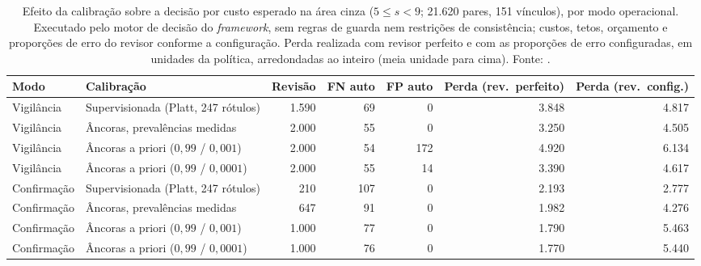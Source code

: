 \begin{table}[!ht]
\centering
\caption{Efeito da calibração sobre a decisão por custo esperado na área cinza ($5\leq s<9$; 21.620 pares, 151 vínculos), por modo operacional. Executado pelo motor de decisão do \textit{framework}, sem regras de guarda nem restrições de consistência; custos, tetos, orçamento e proporções de erro do revisor conforme a configuração. Perda realizada com revisor perfeito e com as proporções de erro configuradas, em unidades da política, arredondadas ao inteiro (meia unidade para cima). Fonte: .}
\label{tab:cap8-ancoras-decisao}
\scriptsize
\setlength{\tabcolsep}{3pt}
\begin{tabular}{|l|l|r|r|r|r|r|}
\hline
Modo & Calibração & Revisão & FN auto & FP auto & Perda (rev.\ perfeito) & Perda (rev.\ config.) \\
\hline
Vigilância & Supervisionada (Platt, 247 rótulos) & 1.590 & 69 & 0 & 3.848 & 4.817 \\
Vigilância & Âncoras, prevalências medidas & 2.000 & 55 & 0 & 3.250 & 4.505 \\
Vigilância & Âncoras a priori ($0{,}99$ / $0{,}001$) & 2.000 & 54 & 172 & 4.920 & 6.134 \\
Vigilância & Âncoras a priori ($0{,}99$ / $0{,}0001$) & 2.000 & 55 & 14 & 3.390 & 4.617 \\
\hline
Confirmação & Supervisionada (Platt, 247 rótulos) & 210 & 107 & 0 & 2.193 & 2.777 \\
Confirmação & Âncoras, prevalências medidas & 647 & 91 & 0 & 1.982 & 4.276 \\
Confirmação & Âncoras a priori ($0{,}99$ / $0{,}001$) & 1.000 & 77 & 0 & 1.790 & 5.463 \\
Confirmação & Âncoras a priori ($0{,}99$ / $0{,}0001$) & 1.000 & 76 & 0 & 1.770 & 5.440 \\
\hline
\end{tabular}
\end{table}
